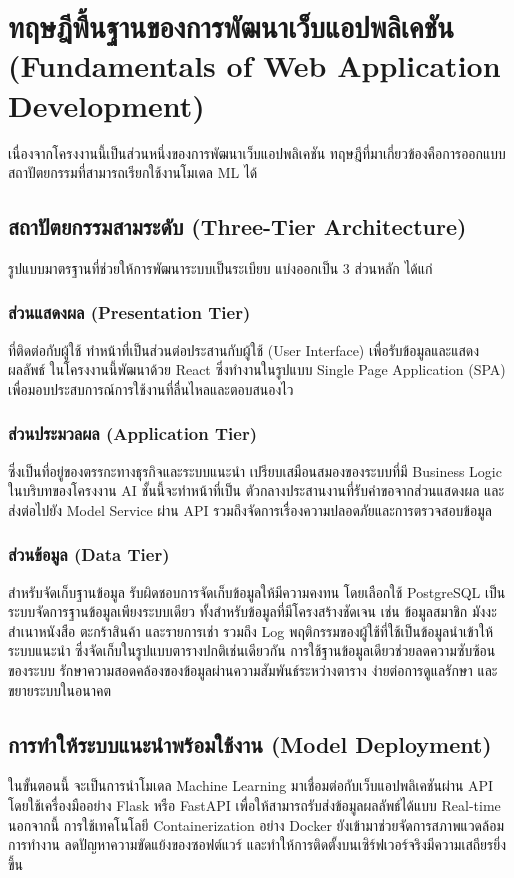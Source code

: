 \section{ทฤษฎีพื้นฐานของการพัฒนาเว็บแอปพลิเคชัน (Fundamentals of Web Application Development)}
เนื่องจากโครงงานนี้เป็นส่วนหนึ่งของการพัฒนาเว็บแอปพลิเคชัน ทฤษฎีที่มาเกี่ยวข้องคือการออกแบบสถาปัตยกรรมที่สามารถเรียกใช้งานโมเดล ML ได้ \cite{sommerville2016}

\subsection{สถาปัตยกรรมสามระดับ (Three-Tier Architecture)}

รูปแบบมาตรฐานที่ช่วยให้การพัฒนาระบบเป็นระเบียบ แบ่งออกเป็น 3 ส่วนหลัก ได้แก่

\subsubsection{ส่วนแสดงผล (Presentation Tier)}
ที่ติดต่อกับผู้ใช้ ทำหน้าที่เป็นส่วนต่อประสานกับผู้ใช้ (User Interface) เพื่อรับข้อมูลและแสดงผลลัพธ์ ในโครงงานนี้พัฒนาด้วย React ซึ่งทำงานในรูปแบบ Single Page Application (SPA) เพื่อมอบประสบการณ์การใช้งานที่ลื่นไหลและตอบสนองไว

\subsubsection{ส่วนประมวลผล (Application Tier)}
ซึ่งเป็นที่อยู่ของตรรกะทางธุรกิจและระบบแนะนำ เปรียบเสมือนสมองของระบบที่มี Business Logic ในบริบทของโครงงาน AI ชั้นนี้จะทำหน้าที่เป็น ตัวกลางประสานงานที่รับคำขอจากส่วนแสดงผล และส่งต่อไปยัง Model Service ผ่าน API รวมถึงจัดการเรื่องความปลอดภัยและการตรวจสอบข้อมูล

\subsubsection{ส่วนข้อมูล (Data Tier)}
สำหรับจัดเก็บฐานข้อมูล รับผิดชอบการจัดเก็บข้อมูลให้มีความคงทน โดยเลือกใช้ PostgreSQL เป็นระบบจัดการฐานข้อมูลเพียงระบบเดียว ทั้งสำหรับข้อมูลที่มีโครงสร้างชัดเจน เช่น ข้อมูลสมาชิก มังงะ สำเนาหนังสือ ตะกร้าสินค้า และรายการเช่า รวมถึง Log พฤติกรรมของผู้ใช้ที่ใช้เป็นข้อมูลนำเข้าให้ระบบแนะนำ ซึ่งจัดเก็บในรูปแบบตารางปกติเช่นเดียวกัน การใช้ฐานข้อมูลเดียวช่วยลดความซับซ้อนของระบบ รักษาความสอดคล้องของข้อมูลผ่านความสัมพันธ์ระหว่างตาราง ง่ายต่อการดูแลรักษา และขยายระบบในอนาคต

\subsection{การทำให้ระบบแนะนำพร้อมใช้งาน (Model Deployment)}

ในขั้นตอนนี้ จะเป็นการนำโมเดล Machine Learning มาเชื่อมต่อกับเว็บแอปพลิเคชันผ่าน API โดยใช้เครื่องมืออย่าง Flask หรือ FastAPI เพื่อให้สามารถรับส่งข้อมูลผลลัพธ์ได้แบบ Real-time นอกจากนี้ การใช้เทคโนโลยี Containerization อย่าง Docker ยังเข้ามาช่วยจัดการสภาพแวดล้อมการทำงาน ลดปัญหาความขัดแย้งของซอฟต์แวร์ และทำให้การติดตั้งบนเซิร์ฟเวอร์จริงมีความเสถียรยิ่งขึ้น \cite{mltestscore_nd}